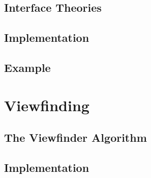 \documentclass[a4paper,11pt]{book}
\begin{document}

\section{Interface Theories}\label{sec:crosslib:translate:interfaces}

%


\section{Implementation}\label{sec:crosslib:translate:impl}


\section{Example}\label{sec:crosslib:translate:ex}


\chapter{Viewfinding}\label{sec:crosslib:vf}


%

\section{The Viewfinder Algorithm}


\section{Implementation}\label{sec:crosslib:vf:impl}

\end{document}
